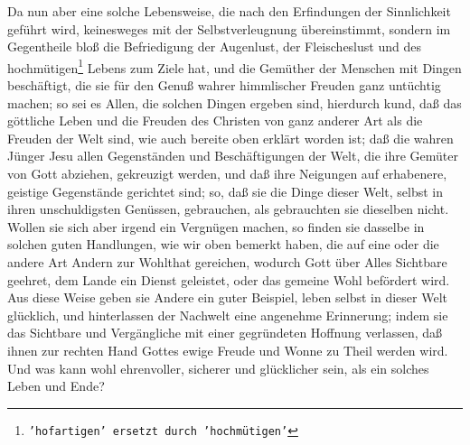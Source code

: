 Da nun aber eine solche Lebensweise, die nach den Erfindungen der Sinnlichkeit
geführt wird, keinesweges mit der Selbstverleugnung übereinstimmt, sondern im
Gegentheile bloß die Befriedigung der Augenlust, der Fleischeslust und des
hochmütigen\footnote{\texttt{'hofartigen' ersetzt durch 'hochmütigen'}} Lebens zum Ziele hat, und die Gemüther der Menschen mit Dingen
beschäftigt, die sie für den Genuß wahrer himmlischer Freuden ganz untüchtig
machen; so sei es Allen, die solchen Dingen ergeben sind, hierdurch kund, daß
das göttliche Leben und die Freuden des Christen von ganz anderer Art als die
Freuden der Welt sind, wie auch bereite oben erklärt worden ist; daß die wahren
Jünger Jesu allen Gegenständen und Beschäftigungen der Welt, die ihre Gemüter
von Gott abziehen, gekreuzigt werden, und daß ihre Neigungen auf erhabenere,
geistige Gegenstände gerichtet sind; so, daß sie die Dinge dieser Welt, selbst
in ihren unschuldigsten Genüssen, gebrauchen, als gebrauchten sie dieselben
nicht. Wollen sie sich aber irgend ein Vergnügen machen, so finden sie dasselbe
in solchen guten Handlungen, wie wir oben bemerkt haben, die auf eine oder die
andere Art Andern zur Wohlthat gereichen, wodurch Gott über Alles Sichtbare
geehret, dem Lande ein Dienst geleistet, oder das gemeine Wohl befördert wird.
Aus diese Weise geben sie Andere ein guter Beispiel, leben selbst in dieser Welt
glücklich, und hinterlassen der Nachwelt eine angenehme Erinnerung; indem sie
das Sichtbare und Vergängliche mit einer gegründeten Hoffnung verlassen, daß
ihnen zur rechten Hand Gottes ewige Freude und Wonne zu Theil werden wird. Und
was kann wohl ehrenvoller, sicherer und glücklicher sein, als ein solches Leben
und Ende?
